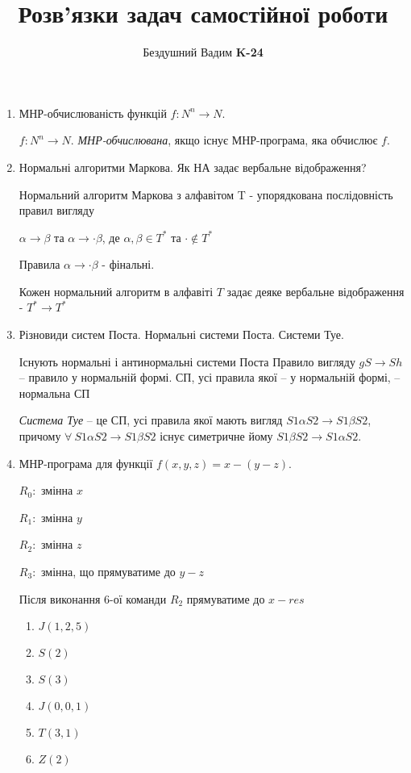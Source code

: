 \documentclass[a4paper, 12pt]{article}
\title{Розв’язки задач самостійної роботи}
\author{Бездушний Вадим \textbf{K-24}}
\date{}
\begin{document}
\maketitle
\begin{enumerate}
\item{МНР-обчислюваність функцій $f : N^{n}\rightarrow N.$ \par
\begin{test-answer}
$f : N^{n}\rightarrow N.$ \textit{МНР-обчислювана}, якщо існує МНР-програма, яка
обчислює $f$.
\end{test-answer}
}
\item{Нормальні алгоритми Маркова. Як НА задає вербальне відображення?\par
\begin{test-answer}
Нормальний алгоритм Маркова з алфавітом T - упорядкована послідовність правил вигляду\par
$\alpha \rightarrow \beta $ та 
$\alpha \rightarrow \cdot \beta $, де 
$\alpha, \beta \in T^{*}$ та $\cdot \notin T^{*}$\par
Правила $\alpha \rightarrow \cdot \beta $ - фінальні.\par
Кожен нормальний алгоритм в алфавіті $T$ задає деяке вербальне відображення - $T^{*}\rightarrow T^{*}$
\end{test-answer}
}
\item{Різновиди систем Поста. Нормальні системи Поста. Системи Туе.
\begin{test-answer}
Існують нормальні і антинормальні системи Поста
Правило вигляду $gS\rightarrow Sh$ – правило у нормальній формі.
СП, усі правила якої – у нормальній формі, – нормальна СП\par
\textit{Система Туе} – це СП, усі правила якої мають вигляд $S1\alpha S2 \rightarrow S1 \beta 
S2$, причому $\forall \:S1\alpha S2 \rightarrow S1 \beta S2$ існує симетричне йому $S1\beta S2 \rightarrow S1 \alpha S2$.
\end{test-answer}
\newpage
}
\item{МНР-програма для функції  $f(x, y, z) = x - (y - z).$
\begin{test-answer-long}

$R_0:$ змінна $x$\par
$R_1:$ змінна $y$\par
$R_2:$ змінна $z$\par
$R_3:$ змінна, що прямуватиме до $y-z$\par
Після виконання 6-ої команди $R_2$ прямуватиме до $x - res$
\begin{enumerate}[1.]
\item{$J(1,2,5)$}
\item{$S(2)$}
\item{$S(3)$}
\item{$J(0,0,1)$}
\item{$T(3,1)$}
\item{$Z(2)$}


\end{enumerate}
\end{test-answer-long}}
\end{enumerate}
\end{document}
